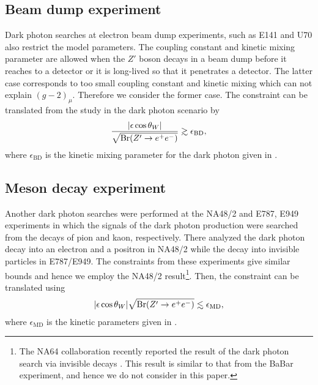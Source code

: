 \documentclass[preprint,amsmath,amssymb,superscriptaddress,nofootinbib]{revtex4}
\newcommand{\lsim}{\raise0.3ex\hbox{$\;<$\kern-0.75em\raise-1.1ex\hbox{$\sim\;$}}}
\newcommand{\gsim}{\raise0.3ex\hbox{$\;>$\kern-0.75em\raise-1.1ex\hbox{$\sim\;$}}}
\begin{document}
\subsection{Beam dump experiment}
Dark photon searches at electron beam dump experiments, such as E141 \cite{Riordan:1987aw} and U70 \cite{Blumlein:2011mv} 
also restrict the model parameters. The coupling constant and kinetic mixing parameter are allowed when the $Z'$ 
boson decays in a beam dump before it reaches to a detector or it is long-lived so that it penetrates a 
detector. The latter case corresponds to too small coupling constant and kinetic mixing which can not explain 
$(g-2)_\mu$. Therefore we consider the former case. The constraint can be translated from the study in the dark photon 
scenario \cite{Essig:2013lka} by
\begin{align}
 \frac{|\epsilon \cos\theta_W|}
       {\sqrt{{\rm Br}(Z'\rightarrow e^+ e^-)}} \gsim \epsilon_{\mathrm{BD}}, \label{eq:beam-dump}
\end{align}
where $\epsilon_{\mathrm{BD}}$ is the kinetic mixing parameter for the dark photon given in \cite{Essig:2013lka}.


\subsection{Meson decay experiment}
Another dark photon searches were performed at the NA48/2 \cite{Batley:2015lha} and E787, E949 \cite{Adler:2004hp, Artamonov:2008qb} 
experiments in which the signals of the dark photon production were searched from the decays of pion and kaon, respectively. 
There analyzed the dark photon decay into an electron and a positron in NA48/2 while the decay into invisible particles in E787/E949. 
The constraints from these experiments give similar bounds and hence we employ the NA48/2 result\footnote{The NA64 collaboration 
recently reported the result of the dark photon search via invisible decays \cite{Banerjee:2016tad}. This result is similar to 
that from the BaBar experiment, and hence we do not consider in this paper. }. 
Then, the constraint can be translated using 
\begin{align}
 |\epsilon \cos\theta_W| \sqrt{{\mathrm{Br}}(Z'\rightarrow e^+ e^-)}
  \lsim
 \epsilon_{\mathrm{MD}},
\end{align}
where $\epsilon_{\mathrm{MD}}$ is the kinetic parameters given in \cite{Batley:2015lha}.
\end{document}
